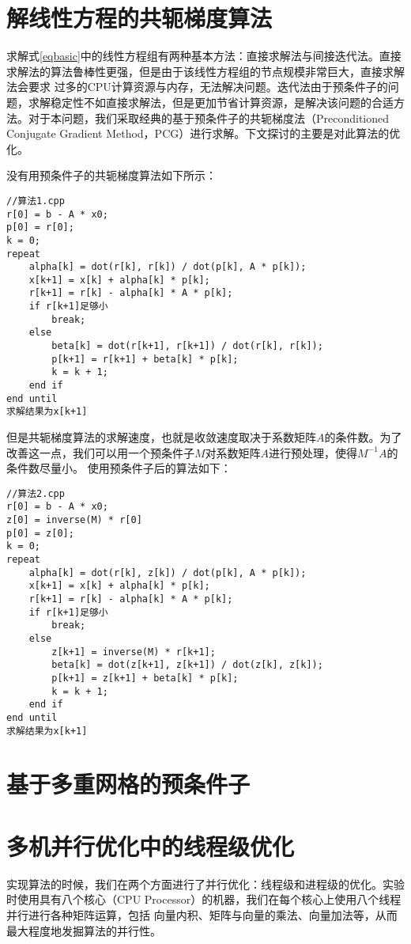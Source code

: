 \section{解线性方程的共轭梯度算法}

求解式\ref{eqbasic}中的线性方程组有两种基本方法：直接求解法与间接迭代法。直接求解法的算法鲁棒性更强，但是由于该线性方程组的节点规模非常巨大，直接求解法会要求
过多的CPU计算资源与内存，无法解决问题。迭代法由于预条件子的问题，求解稳定性不如直接求解法，但是更加节省计算资源，是解决该问题的合适方法。对于本问题，我们采取经典的基于预条件子的共轭梯度法（Preconditioned Conjugate Gradient Method，PCG）进行求解。下文探讨的主要是对此算法的优化。

没有用预条件子的共轭梯度算法如下所示：
\begin{lstlisting}
//算法1.cpp
r[0] = b - A * x0;
p[0] = r[0];
k = 0;
repeat
    alpha[k] = dot(r[k], r[k]) / dot(p[k], A * p[k]);
    x[k+1] = x[k] + alpha[k] * p[k];
    r[k+1] = r[k] - alpha[k] * A * p[k];
    if r[k+1]足够小
        break;
    else
        beta[k] = dot(r[k+1], r[k+1]) / dot(r[k], r[k]);
        p[k+1] = r[k+1] + beta[k] * p[k];
        k = k + 1;
    end if
end until
求解结果为x[k+1]
\end{lstlisting}

但是共轭梯度算法的求解速度，也就是收敛速度取决于系数矩阵$A$的条件数。为了改善这一点，我们可以用一个预条件子$M$对系数矩阵$A$进行预处理，使得$M^{-1}A$的条件数尽量小。
使用预条件子后的算法如下：
\begin{lstlisting}
//算法2.cpp
r[0] = b - A * x0;
z[0] = inverse(M) * r[0]
p[0] = z[0];
k = 0;
repeat
    alpha[k] = dot(r[k], z[k]) / dot(p[k], A * p[k]);
    x[k+1] = x[k] + alpha[k] * p[k];
    r[k+1] = r[k] - alpha[k] * A * p[k];
    if r[k+1]足够小
        break;
    else
        z[k+1] = inverse(M) * r[k+1];
        beta[k] = dot(z[k+1], z[k+1]) / dot(z[k], z[k]);
        p[k+1] = z[k+1] + beta[k] * p[k];
        k = k + 1;
    end if
end until
求解结果为x[k+1]
\end{lstlisting}

\section{基于多重网格的预条件子}

\section{多机并行优化中的线程级优化}

实现算法的时候，我们在两个方面进行了并行优化：线程级和进程级的优化。实验时使用具有八个核心（CPU Processor）的机器，我们在每个核心上使用八个线程并行进行各种矩阵运算，包括
向量内积、矩阵与向量的乘法、向量加法等，从而最大程度地发掘算法的并行性。

